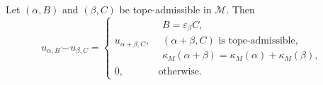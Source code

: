 \documentclass[10pt,a4paper]{amsart}
\newcommand{\M}{\mathcal{M}}
\newcommand{\eps}{\varepsilon}
\begin{document}
\begin{theorem}\label{product-formula}
Let $(\alpha,B)$ and $(\beta,C)$ be tope-admissible in $\M$. Then
\begin{equation}\label{product-eq}
u_{\alpha,B}\smile u_{\beta,C}=\begin{cases}
 u_{\alpha+\beta,C}, &\begin{array}{l}
       B=\eps_\beta C,\\
       (\alpha+\beta,C)\text{ is tope-admissible},\\
       \kappa_M(\alpha+\beta)=\kappa_M(\alpha)+\kappa_M(\beta),
 \end{array}\\[6mm]
 0,&\text{otherwise}.
 \end{cases}
\end{equation}
\end{theorem}
\end{document}
